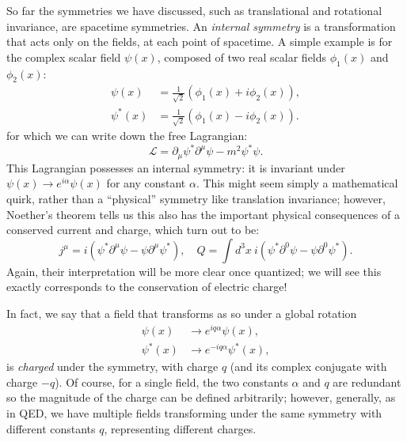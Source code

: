 So far the symmetries we have discussed, such as translational and rotational invariance, are spacetime symmetries.
An \textit{internal symmetry} is a transformation that acts only on the fields, at each point of spacetime.
A simple example is for the complex scalar field $\psi(x)$, composed of two real scalar fields $\phi_1(x)$ and $\phi_2(x)$:
\begin{equation}
	\label{eq:01_qft_symmetries_complex_scalar}
	\begin{split}
		\psi(x) &= \frac{1}{\sqrt{2}}(\phi_1(x) + i\phi_2(x)), \\
		\psi^*(x) &= \frac{1}{\sqrt{2}}(\phi_1(x) - i\phi_2(x)).
	\end{split}
\end{equation}
for which we can write down the free Lagrangian:
\begin{equation}
	\label{eq:01_qft_symmetries_complex_lagrangian}
	\mathcal{L} = \partial_\mu\psi^*\partial^\mu\psi - m^2\psi^*\psi.
\end{equation}
This Lagrangian possesses an internal \UU[1] symmetry: it is invariant under $\psi(x) \rightarrow e^{i\alpha}\psi(x)$ for any constant $\alpha$.
This might seem simply a mathematical quirk, rather than a ``physical'' symmetry like translation invariance; however, Noether's theorem tells us this also has the important physical consequences of a conserved current and charge, which turn out to be:
\begin{equation}
	\label{eq:01_qft_symmetries_u1_current_charge}
	j^\mu = i(\psi^*\partial^\mu\psi - \psi\partial^\mu\psi^*), \quad Q = \int d^3x\ i(\psi^*\partial^0\psi - \psi\partial^0\psi^*).
\end{equation}
Again, their interpretation will be more clear once quantized; we will see this exactly corresponds to the conservation of electric charge!

In fact, we say that a field that transforms as so under a global \UU[1] rotation
\begin{equation}
	\label{eq:01_qft_symmetries_u1_transformation}
	\begin{split}
		\psi(x) &\rightarrow e^{iq\alpha}\psi(x), \\
		\psi^*(x) &\rightarrow e^{-iq\alpha}\psi^*(x),
	\end{split}
\end{equation}
is \textit{charged} under the \UU[1] symmetry, with charge $q$ (and its complex conjugate with charge $-q$).
Of course, for a single field, the two constants $\alpha$ and $q$ are redundant so the magnitude of the charge can be defined arbitrarily; however, generally, as in QED, we have multiple fields transforming under the same \UU[1] symmetry with different constants $q$, representing different charges.

